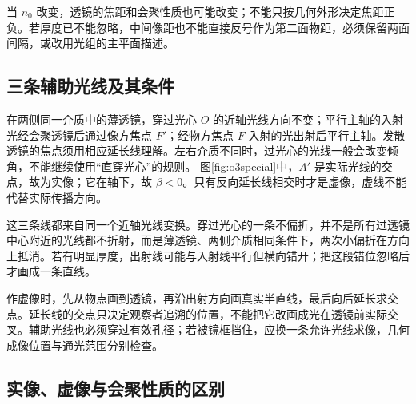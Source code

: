 当 $n_0$ 改变，透镜的焦距和会聚性质也可能改变；不能只按几何外形决定焦距正负。若厚度已不能忽略，中间像距也不能直接反号作为第二面物距，必须保留两面间隔，或改用光组的主平面描述。

\subsection{三条辅助光线及其条件}

在两侧同一介质中的薄透镜，穿过光心 \(O\) 的近轴光线方向不变；平行主轴的入射光经会聚透镜后通过像方焦点 \(F'\)；经物方焦点 \(F\) 入射的光出射后平行主轴。发散透镜的焦点须用相应延长线理解。左右介质不同时，过光心的光线一般会改变倾角，不能继续使用“直穿光心”的规则。
图\ref{fig:o3special}中，\(A'\) 是实际光线的交点，故为实像；它在轴下，故 \(\beta<0\)。只有反向延长线相交时才是虚像，虚线不能代替实际传播方向。

这三条线都来自同一个近轴光线变换。穿过光心的一条不偏折，并不是所有过透镜中心附近的光线都不折射，而是薄透镜、两侧介质相同条件下，两次小偏折在方向上抵消。若有明显厚度，出射线可能与入射线平行但横向错开；把这段错位忽略后才画成一条直线。

作虚像时，先从物点画到透镜，再沿出射方向画真实半直线，最后向后延长求交点。延长线的交点只决定观察者追溯的位置，不能把它改画成光在透镜前实际交叉。辅助光线也必须穿过有效孔径；若被镜框挡住，应换一条允许光线求像，几何成像位置与通光范围分别检查。

\subsection{实像、虚像与会聚性质的区别}

